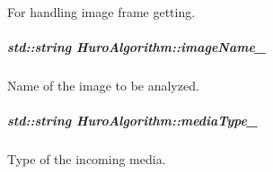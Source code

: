 For handling image frame getting. 

\hypertarget{group___object_recognition_a2a752aeadf9fd6552473b42c2c3e6851}{
\subparagraph[{image\-Name\-\_\-}]{\setlength{\rightskip}{0pt plus 5cm}std\-::string Huro\-Algorithm\-::image\-Name\-\_\-\hspace{0.3cm}{\ttfamily [private]}}}\label{group___object_recognition_a2a752aeadf9fd6552473b42c2c3e6851}


Name of the image to be analyzed. 

\hypertarget{group___object_recognition_a433b1ef87e917a1cdedc519dcc494837}{
\subparagraph[{media\-Type\-\_\-}]{\setlength{\rightskip}{0pt plus 5cm}std\-::string Huro\-Algorithm\-::media\-Type\-\_\-\hspace{0.3cm}{\ttfamily [private]}}}\label{group___object_recognition_a433b1ef87e917a1cdedc519dcc494837}


Type of the incoming media. 

